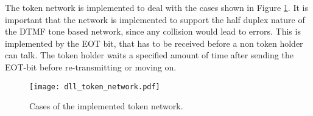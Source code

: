 The token network is implemented to deal with the cases shown in Figure
\ref{fig:dll_token_network}. It is important that the network is implemented to
support the half duplex nature of the DTMF tone based network, since any
collision would lead to errors. This is implemented by the EOT bit, that has to
be received before a non token holder can talk. The token holder waits a specified
amount of time after sending the EOT-bit before re-transmitting or moving on.

\begin{figure}[htb]
	\begin{center}
	\texttt{[image: dll\_token\_network.pdf]}
	\caption{Cases of the implemented token network.}
	\label{fig:dll_token_network}	
	\end{center}
\end{figure}